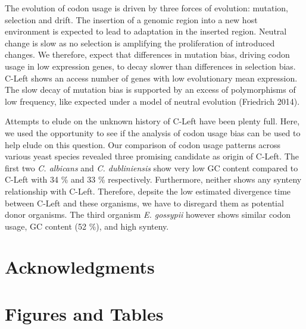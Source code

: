 \documentclass[12pt,draft]{article}
\begin{document}
The evolution of codon usage is driven by three forces of evolution: mutation, selection and drift.
The insertion of a genomic region into a new host environment is expected to lead to adaptation in the inserted region.
Neutral change is slow as no selection is amplifying the proliferation of introduced changes.
We therefore, expect that differences in mutation bias, driving codon usage in low expression genes, to decay slower than differences in selection bias.
C-Left shows an access number of genes with low evolutionary mean expression.
The slow decay of mutation bias is supported by an excess of polymorphisms of low frequency, like expected under a model of neutral evolution (Friedrich 2014).

Attempts to elude on the unknown history of C-Left have been plenty full.
Here, we used the opportunity to see if the analysis of codon usage bias can be used to help elude on this question.
Our comparison of codon usage patterns across various yeast species revealed three promising candidate as origin of C-Left.
The first two \textit{C. albicans} and \textit{C. dubliniensis} show very low GC content compared to C-Left with 34 \% and 33 \% respectively. 
Furthermore, neither shows any synteny relationship with C-Left.
Therefore, depsite the low estimated divergence time between C-Left and these organisms, we have to disregard them as potential donor organisms. 
The third organism \textit{E. gossypii} however shows similar codon usage, GC content (52 \%), and high synteny.  

\section{Acknowledgments}


%



\section{Figures and Tables}
\end{document}
